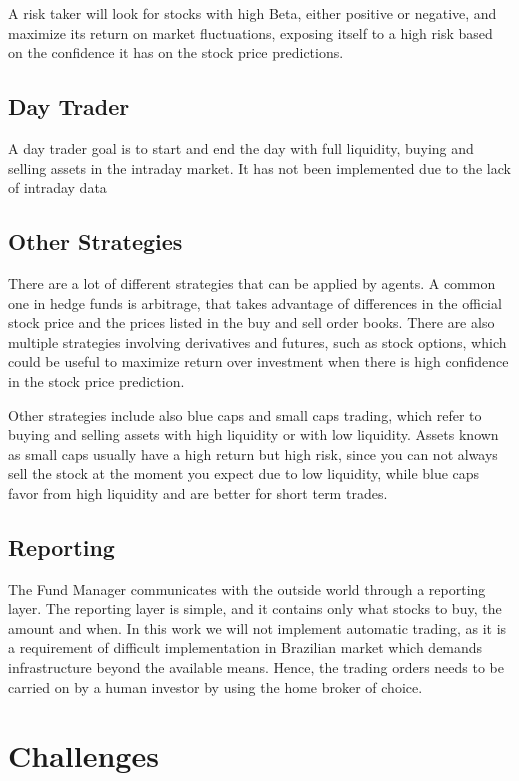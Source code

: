 \documentclass[prodmode,acmtecs]{acmsmall} %
\begin{document}
A risk taker will look for stocks with high Beta, either positive or negative, and maximize its return on market fluctuations, exposing itself to a high risk based on the confidence it has on the stock price predictions.

\subsection {Day Trader}

A day trader goal is to start and end the day with full liquidity, buying and selling assets in the intraday market. It has not been implemented due to the lack of intraday data

\subsection {Other Strategies}

There are a lot of different strategies that can be applied by agents. A common one in hedge funds is arbitrage, that takes advantage of differences in the official stock price and the prices listed in the buy and sell order books. There are also multiple strategies involving derivatives and futures, such as stock options, which could be useful to maximize return over investment when there is high confidence in the stock price prediction.

Other strategies include also blue caps and small caps trading, which refer to buying and selling assets with high liquidity or with low liquidity. Assets known as small caps usually have a high return but high risk, since you can not always sell the stock at the moment you expect due to low liquidity, while blue caps favor from high liquidity and are better for short term trades.

\subsection {Reporting}

The Fund Manager communicates with the outside world through a reporting layer. The reporting layer is simple, and it contains only what stocks to buy, the amount and when. In this work we will not implement automatic trading, as it is a requirement of difficult implementation in Brazilian market which demands infrastructure beyond the available means. Hence, the trading orders needs to be carried on by a human investor by using the home broker of choice. 

\section {Challenges}
\end{document}
